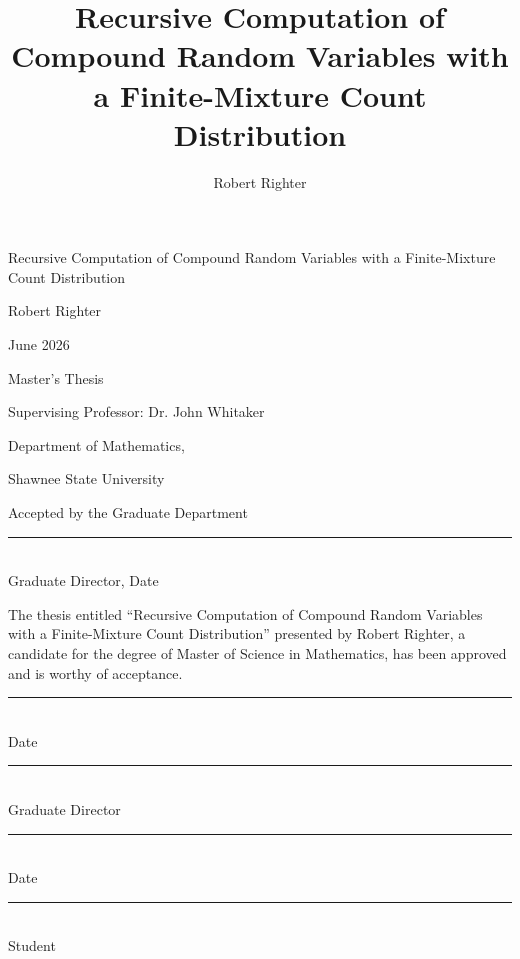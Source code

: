 \documentclass[11pt]{amsart}
\title[Recursive Computation with Finite-Mixture Count Distributions]{Recursive Computation of Compound Random Variables with a Finite-Mixture Count Distribution}
\author{Robert Righter}
\date{}
\theoremstyle{definition}
\theoremstyle{plain}
\begin{document}
\begin{titlepage}
\thispagestyle{empty}
\begin{center}
\vspace*{0.18\textheight}
{\LARGE Recursive Computation of Compound Random Variables with a Finite-Mixture Count Distribution\par}
\vspace{0.14\textheight}
{\Large Robert Righter\par}
\vspace{0.10\textheight}
{\Large June 2026\par}
\vspace{0.8em}
{\Large Master's Thesis\par}
\vspace{0.8em}
{\Large Supervising Professor: Dr. John Whitaker\par}
\vspace{0.8em}
{\Large Department of Mathematics,\par}
\vspace{0.4em}
{\Large Shawnee State University\par}
\vfill
\begin{minipage}{0.46\textwidth}
\raggedright
Accepted by the Graduate Department

\vspace{2.5em}
\rule{\linewidth}{0.4pt}\\[-0.2em]
Graduate Director, Date
\end{minipage}
\end{center}
\end{titlepage}

\begin{titlepage}
\thispagestyle{empty}
\noindent The thesis entitled ``Recursive Computation of Compound Random Variables with a
Finite-Mixture Count Distribution'' presented by Robert Righter, a candidate for the degree of
Master of Science in Mathematics, has
been approved and is worthy of acceptance.

\vspace{3.5em}
\noindent\begin{minipage}[t]{0.42\textwidth}
\rule{0.95\linewidth}{0.4pt}\\[-0.2em]
Date
\end{minipage}%
\hfill
\begin{minipage}[t]{0.42\textwidth}
\rule{0.95\linewidth}{0.4pt}\\[-0.2em]
Graduate Director
\end{minipage}

\vspace{3.5em}
\noindent\begin{minipage}[t]{0.42\textwidth}
\rule{0.95\linewidth}{0.4pt}\\[-0.2em]
Date
\end{minipage}%
\hfill
\begin{minipage}[t]{0.42\textwidth}
\rule{0.95\linewidth}{0.4pt}\\[-0.2em]
Student
\end{minipage}
\end{titlepage}
\end{document}
